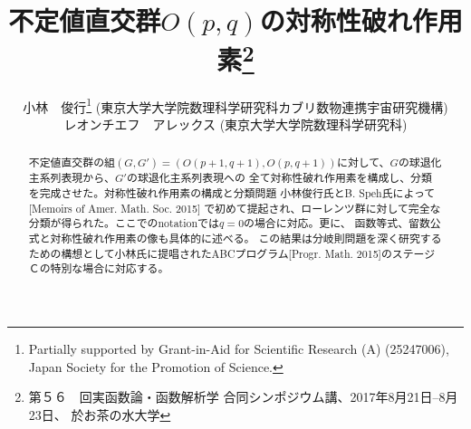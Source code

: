 \documentclass[12pt]{article} %
\theoremstyle{definition}
\theoremstyle{exampstyle} \newtheorem{examp}[theorem]{Theorem}
\newcommand{\doubt}[1]{\uwave{#1}}
\begin{document}
\renewcommand{\abstractname}{概要}

\title{不定値直交群$O(p,q)$の対称性破れ作用素\thanks{第５６　回実函数論・函数解析学 合同シンポジウム講\doubt{算}、2017年8月21日--8月23日、
於\;お茶の水大学}}

\author{小林　俊行\thanks{Partially supported by Grant-in-Aid for Scientific
Research (A) (25247006), Japan Society for the Promotion of Science.} (東京大学\;大学院数理科学研究科\doubt{・}カブリ数物連携宇宙研究機構)\\
  レオンチエフ　アレックス (東京大学\;大学院数理科学研究科)}




  \maketitle
\begin{abstract}
	不定値直交群の組$(G, G') =(O(p+1, q+1), O(p,q+1))$に対して、$G$の球退化主系列表現から、$G'$の球退化主系列表現への
	全て対称性破れ作用素を構成し、分類
	を完成させた。対称性破れ作用素の構成と分類問題\doubt{は}
	小林俊行氏とB. Speh氏によって[Memoirs of Amer. Math. Soc. 2015]
	で初めて提起され、ローレンツ群に対して完全な分類が得られた。ここでのnotationでは$q=0$の場合に対応\doubt{する}。更に、
	函数等式、留数公式と対称性破れ作用素の像も具体的に述べる。
	この結果は分岐則問題を深く研究するための構想として小林氏に提唱されたABCプログラム[Progr. Math. 2015]のステージＣの特別な場合に対応する。
\end{abstract}
\end{document}
